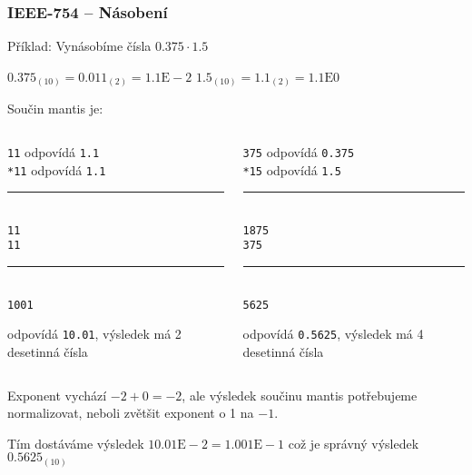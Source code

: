 \documentclass{beamer}
\begin{document}
\begin{frame}
\frametitle{IEEE-754 -- Násobení}

Příklad: Vynásobíme čísla $0.375 \cdot 1.5$

$0.375_{(10)} = 0.011_{(2)} = 1.1\text{E}-2$ \phantom{xxx} $1.5_{(10)} = 1.1_{(2)} = 1.1\text{E}0$

Součin mantis je:\\
\begin{columns}
\begin{column}{0.45\textwidth}
\texttt{\phantom{xxx}11} odpovídá \texttt{1.1}\\
\texttt{\phantom{xx}*11} odpovídá \texttt{1.1}\vspace{-6pt}\\
\rule[0pt]{2cm}{0.4pt}\\
\texttt{\phantom{xxx}11}\\
\texttt{\phantom{xx}11}\vspace{-6pt}\\
\rule[0pt]{2cm}{0.4pt}\\
\texttt{\phantom{x}1001} 

odpovídá \texttt{10.01}, výsledek má 2 desetinná čísla
\end{column}
\hfill
\begin{column}{0.45\textwidth}
\texttt{\phantom{xx}375} odpovídá \texttt{0.375}\\
\texttt{\phantom{xx}*15} odpovídá \texttt{1.5}\vspace{-6pt}\\
\rule[0pt]{2cm}{0.4pt}\\
\texttt{\phantom{x}1875}\\
\texttt{\phantom{x}375}\vspace{-6pt}\\
\rule[0pt]{2cm}{0.4pt}\\
\texttt{\phantom{x}5625} 

odpovídá \texttt{0.5625}, výsledek má 4 desetinná čísla
\end{column}
\end{columns}
\bigskip

Exponent vychází $-2+0=-2$, ale výsledek součinu mantis potřebujeme normalizovat, neboli zvětšit exponent o 1 na $-1$.

Tím dostáváme výsledek $10.01\text{E}-2 = 1.001\text{E}-1$ což je správný výsledek $0.5625_{(10)}$

\end{frame}
\end{document}
